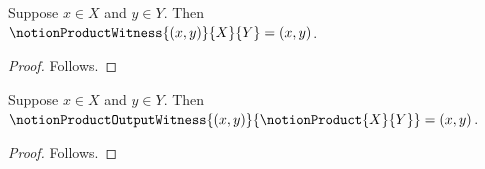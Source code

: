 \begin{proposition}\label{notion_composite_product_client}
    Suppose $x\in X$ and $y\in Y$.
    Then $\notionProductWitness{(x,y)}{X}{Y}=(x,y)$.
\end{proposition}
\begin{proof}
    Follows.
\end{proof}

\begin{proposition}\label{notion_composite_product_unary_client}
    Suppose $x\in X$ and $y\in Y$.
    Then $\notionProductOutputWitness{(x,y)}{\notionProduct{X}{Y}}
        =(x,y)$.
\end{proposition}
\begin{proof}
    Follows.
\end{proof}
